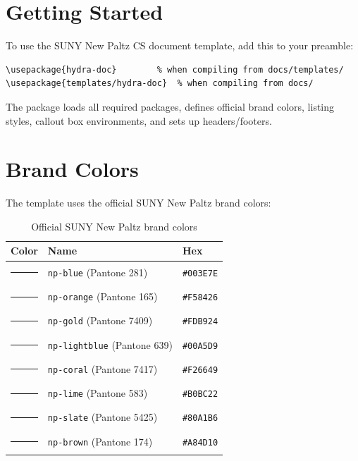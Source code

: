 \documentclass[11pt,a4paper]{article}
\begin{document}

\tableofcontents
\newpage

\section{Getting Started}

To use the SUNY New Paltz CS document template, add this to your preamble:

\begin{lstlisting}[style=bash]
\usepackage{hydra-doc}        % when compiling from docs/templates/
\usepackage{templates/hydra-doc}  % when compiling from docs/
\end{lstlisting}

The package loads all required packages, defines official brand colors,
listing styles, callout box environments, and sets up headers/footers.

\section{Brand Colors}

The template uses the official SUNY New Paltz brand colors:

\begin{table}[H]
\centering
\begin{tabular}{@{}lll@{}}
\toprule
\textbf{Color} & \textbf{Name} & \textbf{Hex} \\
\midrule
\textcolor{np-blue}{\rule{1em}{1em}} & \texttt{np-blue} (Pantone 281) & \texttt{\#003E7E} \\
\textcolor{np-orange}{\rule{1em}{1em}} & \texttt{np-orange} (Pantone 165) & \texttt{\#F58426} \\
\textcolor{np-gold}{\rule{1em}{1em}} & \texttt{np-gold} (Pantone 7409) & \texttt{\#FDB924} \\
\textcolor{np-lightblue}{\rule{1em}{1em}} & \texttt{np-lightblue} (Pantone 639) & \texttt{\#00A5D9} \\
\textcolor{np-coral}{\rule{1em}{1em}} & \texttt{np-coral} (Pantone 7417) & \texttt{\#F26649} \\
\textcolor{np-lime}{\rule{1em}{1em}} & \texttt{np-lime} (Pantone 583) & \texttt{\#B0BC22} \\
\textcolor{np-slate}{\rule{1em}{1em}} & \texttt{np-slate} (Pantone 5425) & \texttt{\#80A1B6} \\
\textcolor{np-brown}{\rule{1em}{1em}} & \texttt{np-brown} (Pantone 174) & \texttt{\#A84D10} \\
\bottomrule
\end{tabular}
\caption{Official SUNY New Paltz brand colors}
\end{table}
\end{document}
